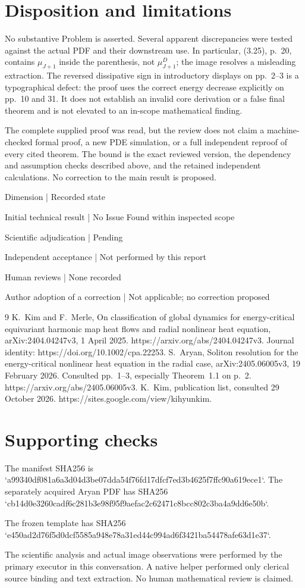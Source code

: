 \documentclass[10pt]{article}
\begin{document}
\section*{Disposition and limitations}
No substantive Problem is asserted. Several apparent discrepancies were tested against the actual PDF and their downstream use. In particular, (3.25), p. 20, contains \(\mu_{J+1}\) inside the parenthesis, not \(\mu_{J+1}^D\); the image resolves a misleading extraction. The reversed dissipative sign in introductory displays on pp. 2–3 is a typographical defect: the proof uses the correct energy decrease explicitly on pp. 10 and 31. It does not establish an invalid core derivation or a false final theorem and is not elevated to an in-scope mathematical finding.\par
The complete supplied proof was read, but the review does not claim a machine-checked formal proof, a new PDE simulation, or a full independent reproof of every cited theorem. The bound is the exact reviewed version, the dependency and assumption checks described above, and the retained independent calculations. No correction to the main result is proposed.\par
Dimension | Recorded state\par
Initial technical result | No Issue Found within inspected scope\par
Scientific adjudication | Pending\par
Independent acceptance | Not performed by this report\par
Human reviews | None recorded\par
Author adoption of a correction | Not applicable; no correction proposed\par
9 K. Kim and F. Merle, On classification of global dynamics for energy-critical equivariant harmonic map heat flows and radial nonlinear heat equation, arXiv:2404.04247v3, 1 April 2025. https://arxiv.org/abs/2404.04247v3. Journal identity: https://doi.org/10.1002/cpa.22253. S. Aryan, Soliton resolution for the energy-critical nonlinear heat equation in the radial case, arXiv:2405.06005v3, 19 February 2026. Consulted pp. 1–3, especially Theorem 1.1 on p. 2. https://arxiv.org/abs/2405.06005v3. K. Kim, publication list, consulted 29 October 2026. https://sites.google.com/view/kihyunkim.\par
\section*{Supporting checks}
The manifest SHA256 is `a99340df081a6a3d04d3be07dda54f76fd17dfcf7ed3b4625f7ffc90a619ece1`. The separately acquired Aryan PDF has SHA256 `cb14d0e3260cadf6c281b3e98f95f9aefac2c62471c8bcc802c3ba4a9dd6e50b`.\par
The frozen template has SHA256 `e450ad2d76f5d0dcf5585a948e78a31ed44c994ad6f3421ba54478afe63d1e37`.\par
The scientific analysis and actual image observations were performed by the primary executor in this conversation. A native helper performed only clerical source binding and text extraction. No human mathematical review is claimed.\par
\end{document}
